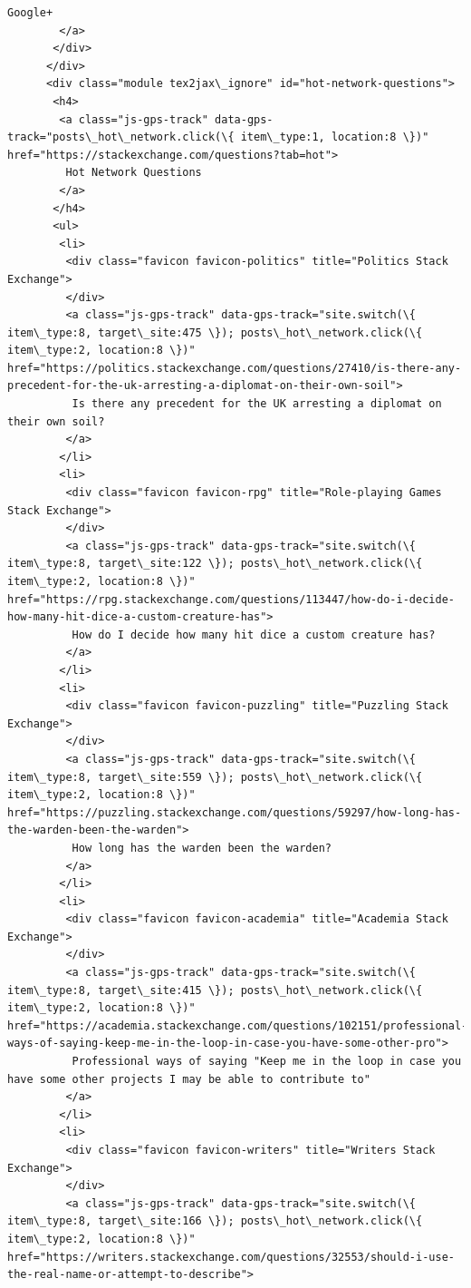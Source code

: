 \documentclass[11pt]{article}
\begin{document}
\begin{Verbatim}[commandchars=\\\{\}]
         Google+
        </a>
       </div>
      </div>
      <div class="module tex2jax\_ignore" id="hot-network-questions">
       <h4>
        <a class="js-gps-track" data-gps-track="posts\_hot\_network.click(\{ item\_type:1, location:8 \})" href="https://stackexchange.com/questions?tab=hot">
         Hot Network Questions
        </a>
       </h4>
       <ul>
        <li>
         <div class="favicon favicon-politics" title="Politics Stack Exchange">
         </div>
         <a class="js-gps-track" data-gps-track="site.switch(\{ item\_type:8, target\_site:475 \}); posts\_hot\_network.click(\{ item\_type:2, location:8 \})" href="https://politics.stackexchange.com/questions/27410/is-there-any-precedent-for-the-uk-arresting-a-diplomat-on-their-own-soil">
          Is there any precedent for the UK arresting a diplomat on their own soil?
         </a>
        </li>
        <li>
         <div class="favicon favicon-rpg" title="Role-playing Games Stack Exchange">
         </div>
         <a class="js-gps-track" data-gps-track="site.switch(\{ item\_type:8, target\_site:122 \}); posts\_hot\_network.click(\{ item\_type:2, location:8 \})" href="https://rpg.stackexchange.com/questions/113447/how-do-i-decide-how-many-hit-dice-a-custom-creature-has">
          How do I decide how many hit dice a custom creature has?
         </a>
        </li>
        <li>
         <div class="favicon favicon-puzzling" title="Puzzling Stack Exchange">
         </div>
         <a class="js-gps-track" data-gps-track="site.switch(\{ item\_type:8, target\_site:559 \}); posts\_hot\_network.click(\{ item\_type:2, location:8 \})" href="https://puzzling.stackexchange.com/questions/59297/how-long-has-the-warden-been-the-warden">
          How long has the warden been the warden?
         </a>
        </li>
        <li>
         <div class="favicon favicon-academia" title="Academia Stack Exchange">
         </div>
         <a class="js-gps-track" data-gps-track="site.switch(\{ item\_type:8, target\_site:415 \}); posts\_hot\_network.click(\{ item\_type:2, location:8 \})" href="https://academia.stackexchange.com/questions/102151/professional-ways-of-saying-keep-me-in-the-loop-in-case-you-have-some-other-pro">
          Professional ways of saying "Keep me in the loop in case you have some other projects I may be able to contribute to"
         </a>
        </li>
        <li>
         <div class="favicon favicon-writers" title="Writers Stack Exchange">
         </div>
         <a class="js-gps-track" data-gps-track="site.switch(\{ item\_type:8, target\_site:166 \}); posts\_hot\_network.click(\{ item\_type:2, location:8 \})" href="https://writers.stackexchange.com/questions/32553/should-i-use-the-real-name-or-attempt-to-describe">

\end{Verbatim}
\end{document}
